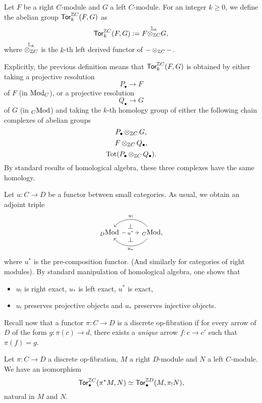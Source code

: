 \documentclass{amsart}
\newcommand{\Tot}{\mathrm{Tot}}
\begin{document}
\begin{definition}
  Let $F$ be a right $C$\nbd-module and $G$ a left $C$\nbd-module. For
  an integer $k \geq 0$, we
  define the abelian group $\mathsf{Tor}^{\mathbb Z C}_{k}(F,G)$ as
  \[
    \mathsf{Tor}^{\mathbb Z C}_{k}(F,G) := F \overset{\mathbb{L}_k}{\operatorname{\otimes}_{\mathbb Z C}} G,
  \]
  where $\overset{\mathbb{L}_k}{\operatorname{\otimes}_{\mathbb Z C}}$ is the $k$\nbd-th left
  derived functor of $-\operatorname{\otimes}_{\mathbb Z C}-$.
\end{definition}
\begin{paragr}
  Explicitly, the previous definition means that $\mathsf{Tor}^{\mathbb Z C}_{k}(F,G)$ is
  obtained by either taking a projective resolution
  \[
    P_{\bullet} \to F
  \]
  of $F$ (in $\mathrm{Mod}_{C}$), or a projective resolution
  \[
    Q_{\bullet} \to G
  \]
  of $G$ (in ${}_{C}\mathrm{Mod}$) and taking the $k$\nbd-th homology group of
  either the following chain complexes of abelian groups
  \[P_{\bullet}\operatorname{\otimes}_{\mathbb Z C}G,\]
  \[F\operatorname{\otimes}_{\mathbb Z C}Q_{\bullet},\]
    \[\Tot(P_{\bullet}\tens_{\Z C}Q_{\bullet}). \]
  By standard results of homological algebra, these three complexes
  have the same homology. 
\end{paragr}
\begin{paragr}
  Let $u \colon C \to D$ be a functor between small categories.  As usual, we obtain an adjoint triple
  \[
    \begin{tikzcd}
      \LMod{D} \ar[r,"u^*" description,""{name=B,above},""{name=C,below}] &
      \LMod{C},\ar[l,"u_!"',bend right=50,""{name=A,below}]
      \ar[l,"u_*",bend left=50,""{name=D,above}]
      \ar[from=A,to=B,"\bot" description, phantom]
      \ar[from=C,to=D,"\bot" description, phantom]
    \end{tikzcd}
  \]
  where $u^*$ is the pre-composition functor. (And similarly for
  categories of right modules). By standard manipulation of
  homological algebra, one shows that
  \begin{itemize}
  \item $u_!$ is right exact, $u_*$ is left exact, $u^*$ is exact,
  \item $u_!$ preserves projective objects and $u_*$ preserves
    injective objects.
  \end{itemize}

  Recall now that a functor $\pi \colon C \to D$ is a discrete
  op-fibration if for every arrow of $D$ of the form $g\colon \pi(c) \to
  d$, there exists a \emph{unique} arrow $f \colon c \to c'$ such
  that $\pi(f)=g$. 
\end{paragr}
\begin{proposition}\label{prop:toropfib}
  Let $\pi \colon C \to D$ a discrete op-fibration, $M$ a right
  $D$\nbd-module and $N$ a left $C$\nbd-module. We have an
  isomorphism
  \[
  \mathsf{Tor}^{\mathbb Z C}_{\bullet}(\pi^*M,N) \simeq \mathsf{Tor}^{\mathbb Z D}_{\bullet}(M,\pi_!N),
  \]
  natural in $M$ and $N$.
\end{proposition}
\end{document}
